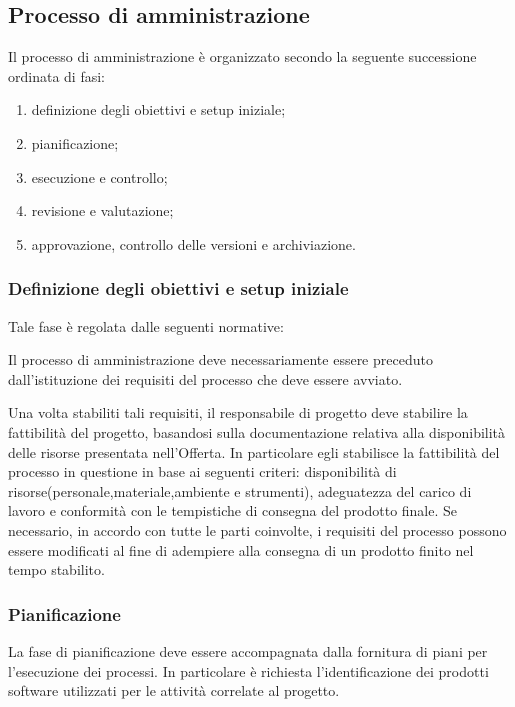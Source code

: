 \subsection{Processo di amministrazione}
Il processo di amministrazione è organizzato secondo la seguente successione ordinata di fasi:

\begin{enumerate}
    \item definizione degli obiettivi e setup iniziale;
    \item pianificazione;
    \item esecuzione e controllo;
    \item revisione e valutazione;
    \item approvazione, controllo delle versioni e archiviazione.
\end{enumerate}

\subsubsection{Definizione degli obiettivi e setup iniziale}
Tale fase è regolata dalle seguenti normative: 

 Il processo di amministrazione deve necessariamente essere preceduto dall'istituzione dei requisiti del processo che deve essere avviato.

 Una volta stabiliti tali requisiti, il responsabile di progetto deve stabilire la fattibilità del progetto, basandosi sulla documentazione relativa alla disponibilità delle risorse presentata nell'Offerta. In particolare egli stabilisce la fattibilità del processo in questione in base ai seguenti criteri: disponibilità di risorse(personale,materiale,ambiente e strumenti), adeguatezza del carico di lavoro e conformità con le tempistiche di consegna del prodotto finale.
Se necessario, in accordo con tutte le parti coinvolte, i requisiti del processo possono essere modificati al fine di adempiere alla consegna di un prodotto finito nel tempo stabilito. 

\subsubsection{Pianificazione}
La fase di pianificazione deve essere accompagnata dalla fornitura di piani per l'esecuzione dei processi. In particolare è richiesta l'identificazione dei prodotti software utilizzati per le attività correlate al progetto. 

